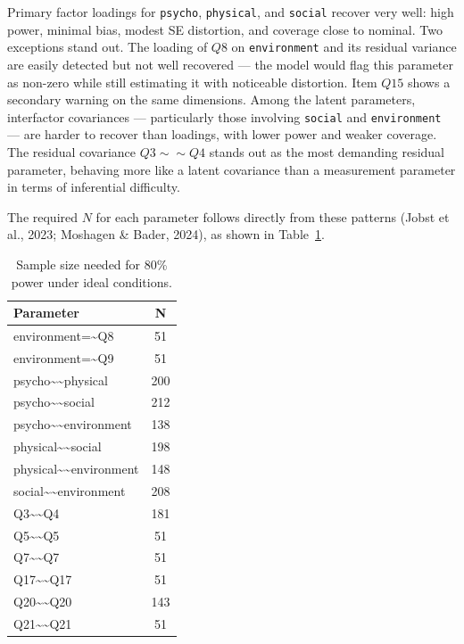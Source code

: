\documentclass[
  letterpaper,
  DIV=11,
  numbers=noendperiod]{scrartcl}
\begin{document}
Primary factor loadings for \texttt{psycho}, \texttt{physical}, and
\texttt{social} recover very well: high power, minimal bias, modest SE
distortion, and coverage close to nominal. Two exceptions stand out. The
loading of \(Q8\) on \texttt{environment} and its residual variance are
easily detected but not well recovered --- the model would flag this
parameter as non-zero while still estimating it with noticeable
distortion. Item \(Q15\) shows a secondary warning on the same
dimensions. Among the latent parameters, interfactor covariances ---
particularly those involving \texttt{social} and \texttt{environment}
--- are harder to recover than loadings, with lower power and weaker
coverage. The residual covariance \(Q3 \sim\sim Q4\) stands out as the
most demanding residual parameter, behaving more like a latent
covariance than a measurement parameter in terms of inferential
difficulty.

The required \(N\) for each parameter follows directly from these
patterns (Jobst et al., 2023; Moshagen \& Bader, 2024), as shown in
Table~\ref{tbl-power-n-ideal}.

{

\begin{longtable}[]{@{}lc@{}}

\caption{\label{tbl-power-n-ideal}Sample size needed for 80\% power
under ideal conditions.}

\tabularnewline

\toprule\noalign{}
Parameter & N \\
\midrule\noalign{}
\endhead
\bottomrule\noalign{}
\endlastfoot
environment=\textasciitilde Q8 & 51 \\
environment=\textasciitilde Q9 & 51 \\
psycho\textasciitilde\textasciitilde physical & 200 \\
psycho\textasciitilde\textasciitilde social & 212 \\
psycho\textasciitilde\textasciitilde environment & 138 \\
physical\textasciitilde\textasciitilde social & 198 \\
physical\textasciitilde\textasciitilde environment & 148 \\
social\textasciitilde\textasciitilde environment & 208 \\
Q3\textasciitilde\textasciitilde Q4 & 181 \\
Q5\textasciitilde\textasciitilde Q5 & 51 \\
Q7\textasciitilde\textasciitilde Q7 & 51 \\
Q17\textasciitilde\textasciitilde Q17 & 51 \\
Q20\textasciitilde\textasciitilde Q20 & 143 \\
Q21\textasciitilde\textasciitilde Q21 & 51 \\

\end{longtable}

}
\end{document}
